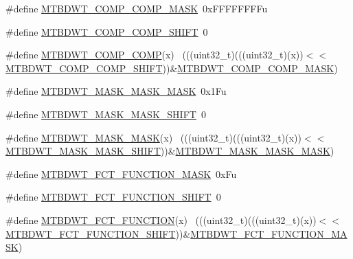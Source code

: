 \begin{DoxyCompactItemize}
\item 
\#define \hyperlink{group___m_t_b_d_w_t___register___masks_ga95b185cf8a19b80b863058a837c0978d}{M\+T\+B\+D\+W\+T\+\_\+\+C\+O\+M\+P\+\_\+\+C\+O\+M\+P\+\_\+\+M\+A\+SK}~0x\+F\+F\+F\+F\+F\+F\+F\+Fu
\item 
\#define \hyperlink{group___m_t_b_d_w_t___register___masks_ga0ec26e5cefc95dac603a0b03b1ad0fdd}{M\+T\+B\+D\+W\+T\+\_\+\+C\+O\+M\+P\+\_\+\+C\+O\+M\+P\+\_\+\+S\+H\+I\+FT}~0
\item 
\#define \hyperlink{group___m_t_b_d_w_t___register___masks_gaa968fdd5c03e1dc0f7f423140b2d6663}{M\+T\+B\+D\+W\+T\+\_\+\+C\+O\+M\+P\+\_\+\+C\+O\+MP}(x)                                        ~(((uint32\+\_\+t)(((uint32\+\_\+t)(x))$<$$<$\hyperlink{group___m_t_b_d_w_t___register___masks_ga0ec26e5cefc95dac603a0b03b1ad0fdd}{M\+T\+B\+D\+W\+T\+\_\+\+C\+O\+M\+P\+\_\+\+C\+O\+M\+P\+\_\+\+S\+H\+I\+FT}))\&\hyperlink{group___m_t_b_d_w_t___register___masks_ga95b185cf8a19b80b863058a837c0978d}{M\+T\+B\+D\+W\+T\+\_\+\+C\+O\+M\+P\+\_\+\+C\+O\+M\+P\+\_\+\+M\+A\+SK})
\item 
\#define \hyperlink{group___m_t_b_d_w_t___register___masks_gaa4fcad7c638af9ad4f678c9b02fe083e}{M\+T\+B\+D\+W\+T\+\_\+\+M\+A\+S\+K\+\_\+\+M\+A\+S\+K\+\_\+\+M\+A\+SK}~0x1\+Fu
\item 
\#define \hyperlink{group___m_t_b_d_w_t___register___masks_ga2ebeb9592fd6b0121c2e3729f5afd2ff}{M\+T\+B\+D\+W\+T\+\_\+\+M\+A\+S\+K\+\_\+\+M\+A\+S\+K\+\_\+\+S\+H\+I\+FT}~0
\item 
\#define \hyperlink{group___m_t_b_d_w_t___register___masks_ga8cf09f38ab03de9139491e2a4c1666d0}{M\+T\+B\+D\+W\+T\+\_\+\+M\+A\+S\+K\+\_\+\+M\+A\+SK}(x)                                        ~(((uint32\+\_\+t)(((uint32\+\_\+t)(x))$<$$<$\hyperlink{group___m_t_b_d_w_t___register___masks_ga2ebeb9592fd6b0121c2e3729f5afd2ff}{M\+T\+B\+D\+W\+T\+\_\+\+M\+A\+S\+K\+\_\+\+M\+A\+S\+K\+\_\+\+S\+H\+I\+FT}))\&\hyperlink{group___m_t_b_d_w_t___register___masks_gaa4fcad7c638af9ad4f678c9b02fe083e}{M\+T\+B\+D\+W\+T\+\_\+\+M\+A\+S\+K\+\_\+\+M\+A\+S\+K\+\_\+\+M\+A\+SK})
\item 
\#define \hyperlink{group___m_t_b_d_w_t___register___masks_ga05376c97e9f6d9af8d411be187d45d4c}{M\+T\+B\+D\+W\+T\+\_\+\+F\+C\+T\+\_\+\+F\+U\+N\+C\+T\+I\+O\+N\+\_\+\+M\+A\+SK}~0x\+Fu
\item 
\#define \hyperlink{group___m_t_b_d_w_t___register___masks_gae855270584ab08b726fd88c288d2e605}{M\+T\+B\+D\+W\+T\+\_\+\+F\+C\+T\+\_\+\+F\+U\+N\+C\+T\+I\+O\+N\+\_\+\+S\+H\+I\+FT}~0
\item 
\#define \hyperlink{group___m_t_b_d_w_t___register___masks_gac876a93af0063e7a677d23ec30367b75}{M\+T\+B\+D\+W\+T\+\_\+\+F\+C\+T\+\_\+\+F\+U\+N\+C\+T\+I\+ON}(x)                                  ~(((uint32\+\_\+t)(((uint32\+\_\+t)(x))$<$$<$\hyperlink{group___m_t_b_d_w_t___register___masks_gae855270584ab08b726fd88c288d2e605}{M\+T\+B\+D\+W\+T\+\_\+\+F\+C\+T\+\_\+\+F\+U\+N\+C\+T\+I\+O\+N\+\_\+\+S\+H\+I\+FT}))\&\hyperlink{group___m_t_b_d_w_t___register___masks_ga05376c97e9f6d9af8d411be187d45d4c}{M\+T\+B\+D\+W\+T\+\_\+\+F\+C\+T\+\_\+\+F\+U\+N\+C\+T\+I\+O\+N\+\_\+\+M\+A\+SK})
$$
\end{DoxyCompactItemize}
